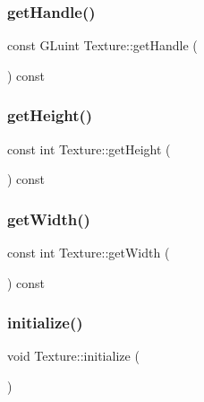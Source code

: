 \mbox{\label{class_texture_a7cfdb814d042c86a3522d1a9fa10e952}} 
\subsubsection{\texorpdfstring{get\+Handle()}{getHandle()}}
{\footnotesize\ttfamily const G\+Luint Texture\+::get\+Handle (\begin{DoxyParamCaption}{ }\end{DoxyParamCaption}) const\hspace{0.3cm}{\ttfamily [inline]}}

\mbox{\label{class_texture_a5353c4a272879e82413fc386076350cc}} 
\subsubsection{\texorpdfstring{get\+Height()}{getHeight()}}
{\footnotesize\ttfamily const int Texture\+::get\+Height (\begin{DoxyParamCaption}{ }\end{DoxyParamCaption}) const\hspace{0.3cm}{\ttfamily [inline]}}

\mbox{\label{class_texture_af9842e562b0f355f36edac7ab09507a3}} 
\subsubsection{\texorpdfstring{get\+Width()}{getWidth()}}
{\footnotesize\ttfamily const int Texture\+::get\+Width (\begin{DoxyParamCaption}{ }\end{DoxyParamCaption}) const\hspace{0.3cm}{\ttfamily [inline]}}

\mbox{\label{class_texture_a26451a093dfccfd4b4ce58b9bd3c7189}} 
\subsubsection{\texorpdfstring{initialize()}{initialize()}}
{\footnotesize\ttfamily void Texture\+::initialize (\begin{DoxyParamCaption}{ }\end{DoxyParamCaption})}



